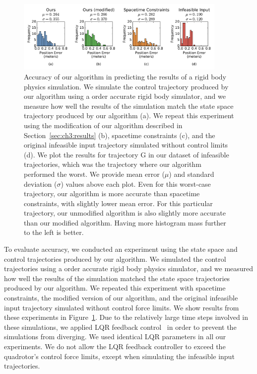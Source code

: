 \begin{figure}[t!]
\centering
\includegraphics[width=4.0in]{images/2016_siggraph/02_accuracy.pdf}
\caption{
Accuracy of our algorithm in predicting the results of a rigid body physics simulation.
We simulate the control trajectory produced by our algorithm using a  order accurate rigid body simulator, and we measure how well the results of the simulation match the state space trajectory produced by our algorithm (a).
We repeat this experiment using the modification of our algorithm described in Section~\ref{sec:ch3:results} (b), spacetime constraints (c), and the original infeasible input trajectory simulated without control limits (d).
We plot the results for trajectory \textsc{G} in our dataset of infeasible trajectories, which was the trajectory where our algorithm performed the worst.
We provide mean error ($\mu$) and standard deviation ($\sigma$) values above each plot.
Even for this worst-case trajectory, our algorithm is more accurate than spacetime constraints, with slightly lower mean error.
For this particular trajectory, our unmodified algorithm is also slightly more accurate than our modified algorithm.
Having more histogram mass further to the left is better.
}
\label{fig:ch3:accuracy}
\end{figure}

To evaluate accuracy, we conducted an experiment using the state space and control trajectories produced by our algorithm.
We simulated the control trajectories using a  order accurate rigid body physics simulator, and we measured how well the results of the simulation matched the state space trajectories produced by our algorithm.
We repeated this experiment with spacetime constraints, the modified version of our algorithm, and the original infeasible input trajectory simulated without control force limits.
We show results from these experiments in Figure~\ref{fig:ch3:accuracy}.
Due to the relatively large time steps involved in these simulations, we applied LQR feedback control~\cite{tedrake:2016} in order to prevent the simulations from diverging.
We used identical LQR parameters in all our experiments.
We do not allow the LQR feedback controller to exceed the quadrotor's control force limits, except when simulating the infeasible input trajectories.

